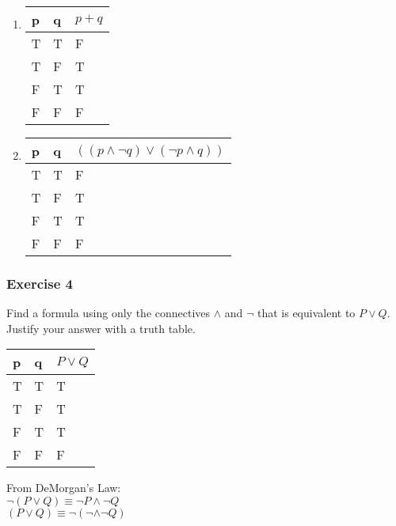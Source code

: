 
\begin{solution}
    \begin{enumerate}[label=(\alph*)]
        \item {
            \begin{tabular}[c]{l l | l}
            p & q & $p + q$ \\ \hline
            T & T & F \\
            T & F & T \\
            F & T & T \\
            F & F & F
            \end{tabular}
        }
        
        \item {
            \begin{tabular}[c]{l l | l}
                p & q & $((p \wedge \neg q) \vee (\neg p \wedge q))$ \\ \hline
                T & T & F \\
                T & F & T \\
                F & T & T \\
                F & F & F
            \end{tabular}
        }
    \end{enumerate}
\end{solution}

\subsubsection{Exercise 4}

\question Find a formula using only the connectives $\wedge$ and $\neg$ that is equivalent to $P \vee Q$.  Justify your answer with a truth table.

\begin{solution}
        \begin{tabular}[c]{l l | l}
            p & q & $P \vee Q$ \\ \hline
            T & T & T \\
            T & F & T \\
            F & T & T \\
            F & F & F
        \end{tabular}
    
    From DeMorgan's Law: \\
    $\neg( P \vee Q) \equiv \neg P \wedge \neg Q$ \\
    $(P \vee Q) \equiv \neg(\neg \wedge \neg Q)$
\end{solution}



